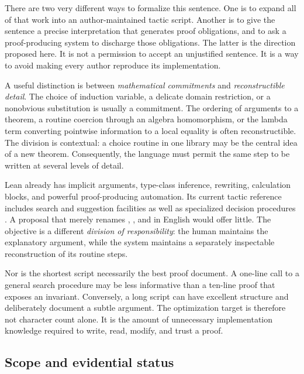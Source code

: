 \documentclass[11pt,letterpaper]{article}
\newcommand{\code}[1]{\texttt{\detokenize{#1}}}
\theoremstyle{remark}
\begin{document}
There are two very different ways to formalize this sentence. One is to expand all of that work into an author-maintained tactic script. Another is to give the sentence a precise interpretation that generates proof obligations, and to ask a proof-producing system to discharge those obligations. The latter is the direction proposed here. It is not a permission to accept an unjustified sentence. It is a way to avoid making every author reproduce its implementation.

A useful distinction is between \emph{mathematical commitments} and \emph{reconstructible detail}. The choice of induction variable, a delicate domain restriction, or a nonobvious substitution is usually a commitment. The ordering of arguments to a theorem, a routine coercion through an algebra homomorphism, or the lambda term converting pointwise information to a local equality is often reconstructible. The division is contextual: a choice routine in one library may be the central idea of a new theorem. Consequently, the language must permit the same step to be written at several levels of detail.

Lean already has implicit arguments, type-class inference, rewriting, calculation blocks, and powerful proof-producing automation. Its current tactic reference includes search and suggestion facilities as well as specialized decision procedures \cite{lean-elaboration,lean-tactics}. A proposal that merely renames \code{have}, \code{calc}, and \code{aesop} in English would offer little. The objective is a different \emph{division of responsibility}: the human maintains the explanatory argument, while the system maintains a separately inspectable reconstruction of its routine steps.

Nor is the shortest script necessarily the best proof document. A one-line call to a general search procedure may be less informative than a ten-line proof that exposes an invariant. Conversely, a long script can have excellent structure and deliberately document a subtle argument. The optimization target is therefore not character count alone. It is the amount of unnecessary implementation knowledge required to write, read, modify, and trust a proof.

\subsection{Scope and evidential status}
\end{document}
